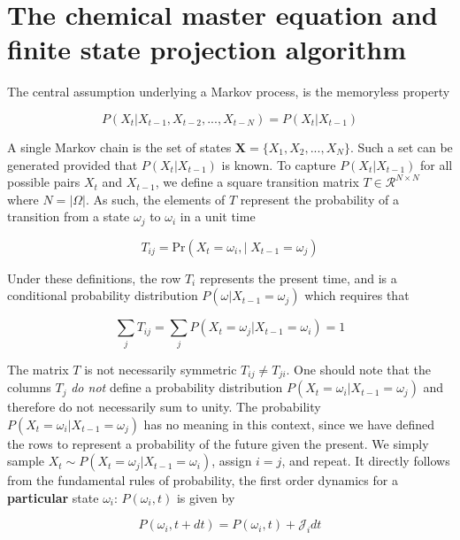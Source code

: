 \documentclass{ucetd}
\begin{document}
\section{The chemical master equation and finite state projection algorithm}


The central assumption underlying a Markov process, is the memoryless property

\begin{equation*}
P(X_{t}|X_{t-1}, X_{t-2}, ..., X_{t-N}) = P(X_{t}|X_{t-1})
\end{equation*}

A single Markov chain is the set of states $\bm{X} = \{X_{1},X_{2},...,X_{N}\}$. Such a set can be generated provided that $P(X_{t}|X_{t-1})$ is known. To capture $P(X_{t}|X_{t-1})$ for all possible pairs $X_{t}$ and $X_{t-1}$, we define a square transition matrix $T\in \mathcal{R}^{N\times N}$ where $N = |\Omega|$. As such, the elements of $T$ represent the probability of a transition from a state $\omega_{j}$ to $\omega_{i}$ in a unit time

\begin{equation*}
T_{ij} = \mathrm{Pr}\left(X_{t}=\omega_{i}, | \;X_{t-1}=\omega_{j}\right)
\end{equation*}

Under these definitions, the row $T_{i}$ represents the present time, and is a conditional  probability distribution $P(\omega | X_{t-1} = \omega_{j})$ which requires that

\begin{equation*}
\sum_{j}T_{ij} = \sum_{j} P(X_{t} = \omega_{j} | X_{t-1} = \omega_{i}) = 1
\end{equation*}

The matrix $T$ is not necessarily symmetric $T_{ij} \neq T_{ji}$. One should note that the columns $T_{j}$ \emph{do not} define a probability distribution $P(X_{t} = \omega_{i} | X_{t-1} = \omega_{j})$ and therefore do not necessarily sum to unity. The probability $P(X_{t} = \omega_{i} | X_{t-1} = \omega_{j})$ has no meaning in this context, since we have defined the rows to represent a probability of the future given the present. We simply sample $X_{t} \sim P(X_{t} = \omega_{j} | X_{t-1} = \omega_{i})$, assign $i=j$, and repeat. It directly follows from the fundamental rules of probability, the first order dynamics for a \textbf{particular} state $\omega_{i}$: $P(\omega_{i},t)$ is given by

\begin{equation}
P(\omega_{i},t+dt) = P(\omega_{i},t) + \mathcal{J}_{i}dt
\end{equation}
\end{document}
